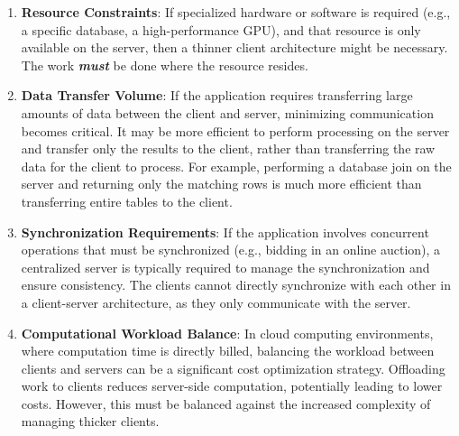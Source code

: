 \begin{enumerate}[itemsep=1pt, topsep=1pt]
    \item \textbf{Resource Constraints}: If specialized hardware or software is required (e.g., a specific database, a high-performance GPU), and that resource is only available on the server, then a thinner client architecture might be necessary.  The work \textit{\textbf{must}} be done where the resource resides.

    \item \textbf{Data Transfer Volume}: If the application requires transferring large amounts of data between the client and server, minimizing communication becomes critical.  It may be more efficient to perform processing on the server and transfer only the results to the client, rather than transferring the raw data for the client to process.  For example, performing a database join on the server and returning only the matching rows is much more efficient than transferring entire tables to the client.

    \item \textbf{Synchronization Requirements}:  If the application involves concurrent operations that must be synchronized (e.g., bidding in an online auction), a centralized server is typically required to manage the synchronization and ensure consistency.  The clients cannot directly synchronize with each other in a client-server architecture, as they only communicate with the server.

   \item \textbf{Computational Workload Balance}:  In cloud computing environments, where computation time is directly billed, balancing the workload between clients and servers can be a significant cost optimization strategy. Offloading work to clients reduces server-side computation, potentially leading to lower costs. However, this must be balanced against the increased complexity of managing thicker clients.
\end{enumerate}


